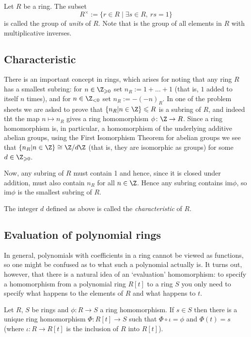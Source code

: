 \documentclass{maths}
\begin{document}
\begin{defn}
    Let $R$ be a ring.
    The subset
    \[
        R^{\times} :=
        \{r\in R \mid \exists s\in R, ~ rs=1\}
    \]
    is called the group of \emph{units} of $R$.
    Note that is the group of all elements in $R$ with multiplicative inverses.
\end{defn}

\subsection{Characteristic}

There is an important concept in rings, which arises for noting that any ring $R$ has a smallest subring: for $n\in\Z_{\geqslant0}$ set $n_R:=1+\ldots+1$ (that is, $1$ added to itself $n$ times), and for $n\in\Z_{<0}$ set $n_R:=-(-n)_R$.
In one of the problem sheets we are asked to prove that $\{n_R|n\in\Z\}\leqslant R$ is a subring of $R$, and indeed tht the map $n\mapsto n_R$ gives a ring homomorphism $\phi\colon\Z\to R$.
Since a ring homomorphism is, in particular, a homomorphism of the underlying additive abelian groups, using the First Isomorphism Theorem for abelian groups we see that $\{n_R|n\in\Z\}\cong\Z/d\Z$ (that is, they are isomorphic as groups) for some $d\in\Z_{\geqslant0}$.

Now, any subring of $R$ must contain 1 and hence, since it is closed under addition, must also contain $n_R$ for all $n\in\Z$.
Hence any subring contains $\mathrm{im}\phi$, so $\mathrm{im}\phi$ is the smallest subring of $R$.

\begin{defn}[Characteristic]
    The integer $d$ defined as above is called the \emph{characteristic} of $R$.
\end{defn}

\subsection{Evaluation of polynomial rings}

In general, polynomials with coefficients in a ring cannot be viewed as functions, so one might be confused as to what such a polynomial actually is.
It turns out, however, that there is a natural idea of an `evaluation' homomorphism: to specify a homomorphism from a polynomial ring $R[t]$ to a ring $S$ you only need to specify what happens to the elements of $R$ and what happens to $t$.

\begin{lem}
    Let $R$, $S$ be rings and $\phi\colon R\to S$ a ring homomorphism.
    If $s\in S$ then there is a unique ring homomorphism $\Phi\colon R[t]\to S$ such that $\Phi\circ \iota=\phi$ and $\Phi(t)=s$ (where $\iota\colon R\to R[t]$ is the inclusion of $R$ into $R[t]$).
\end{lem}
\end{document}
